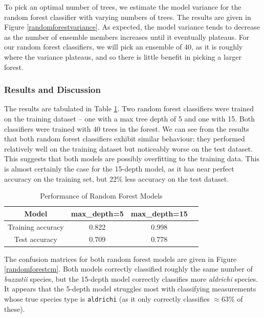 To pick an optimal number of trees, we estimate the model variance for the random forest classifier with varying numbers of trees. The results are given in Figure \ref{randomforestvariance}. As expected, the model variance tends to decrease as the number of ensemble members increases until it eventually plateaus. For our random forest classifiers, we will pick an ensemble of 40, as it is roughly where the variance plateaus, and so there is little benefit in picking a larger forest.

\subsubsection{Results and Discussion}

The results are tabulated in Table \ref{randomforestperformance}. Two random forest classifiers were trained on the training dataset -- one with a max tree depth of 5 and one with 15. Both classifiers were trained with 40 trees in the forest. We can see from the results that both random forest classifiers exhibit similar behaviour: they performed relatively well on the training dataset but noticeably worse on the test dataset. This suggests that both models are possibly overfitting to the training data. This is almost certainly the case for the 15-depth model, as it has near perfect accuracy on the training set, but 22\% less accuracy on the test dataset.

\begin{table}[!ht]
\begin{center}
\begin{tabular}{|c|c|c|c|}
\hline
Model             & max\_depth=5 & max\_depth=15 \\ \hline
Training accuracy & 0.822  & 0.998 \\ \hline
Test accuracy     & 0.709  & 0.778 \\ \hline
\end{tabular}
\end{center}
\caption{Performance of Random Forest Models}
\label{randomforestperformance}
\end{table}

The confusion matrices for both random forest models are given in Figure \ref{randomforestcm}. Both models correctly classified roughly the same number of \textit{buzzatii} species, but the 15-depth model correctly classifies more \textit{aldrichi} species. It appears that the 5-depth model struggles most with classifying measurements whose true species type is \texttt{aldrichi} (as it only correctly classifies $\approx 63\%$ of these).

